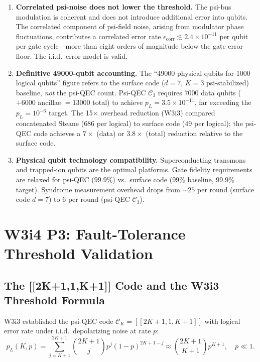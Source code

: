 \documentclass[11pt]{article}
\theoremstyle{definition}
\theoremstyle{remark}
\begin{document}
\begin{enumerate}
  \item \textbf{Correlated psi-noise does not lower the threshold.}
    The psi-bus modulation is coherent and does not introduce additional error
    into qubits.  The correlated component of psi-field noise, arising from
    modulator phase fluctuations, contributes a correlated error rate
    $\epsilon_{\mathrm{corr}} \lesssim 2.4\times10^{-11}$ per qubit per gate
    cycle---more than eight orders of magnitude below the gate error floor.
    The i.i.d.\ error model is valid.

  \item \textbf{Definitive 49000-qubit accounting.}  The ``49000 physical
    qubits for 1000 logical qubits'' figure refers to the surface code
    ($d=7$, $K=3$ psi-stabilized) baseline, \emph{not} the psi-QEC count.
    Psi-QEC $\mathcal{C}_3$ requires 7000 data qubits ($+6000$ ancillae $= 13000$
    total) to achieve $p_L = 3.5\times10^{-11}$, far exceeding the
    $p_L = 10^{-6}$ target.  The 15$\times$ overhead reduction (W3i3) compared
    concatenated Steane ($686$ per logical) to surface code ($49$ per logical);
    the psi-QEC code achieves a $7\times$ (data) or $3.8\times$ (total) reduction
    relative to the surface code.

  \item \textbf{Physical qubit technology compatibility.}  Superconducting
    transmons and trapped-ion qubits are the optimal platforms.  Gate fidelity
    requirements are relaxed for psi-QEC ($99.9\%$) vs.\ surface code ($99\%$
    baseline, $99.9\%$ target).  Syndrome measurement overhead drops from
    $\sim25$ per round (surface code $d=7$) to $6$ per round (psi-QEC $\mathcal{C}_3$).
\end{enumerate}

\section{W3i4 P3: Fault-Tolerance Threshold Validation}
\label{sec:threshold}

\subsection{The [[2K+1,1,K+1]] Code and the W3i3 Threshold Formula}
\label{sec:code-review}

W3i3 established the psi-QEC code $\mathcal{C}_K = [[2K+1,1,K+1]]$ with
logical error rate under i.i.d.\ depolarizing noise at rate $p$:
\begin{equation}
  p_L(K,p) = \sum_{j=K+1}^{2K+1}\binom{2K+1}{j}p^j(1-p)^{2K+1-j}
  \approx \binom{2K+1}{K+1}p^{K+1}, \quad p \ll 1.
  \label{eq:pl-exact}
\end{equation}
\end{document}
